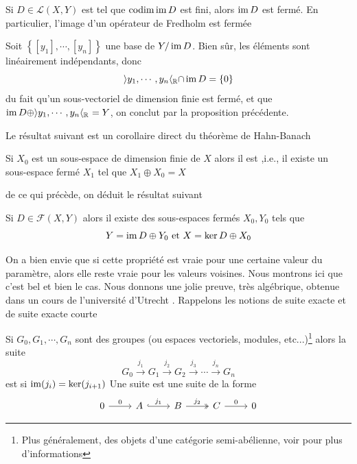 \documentclass[memoire.tex]{subfiles}
\begin{document}
\begin{corollaire}\label{im-fred-closed}
    Si $D\in\mathcal{L}(X,Y)$ est tel que $\operatorname*{codim} \operatorname{im} D$ est fini, alors $\operatorname{im} D$ est fermé. En particulier, l'image d'un opérateur de Fredholm est fermée
\end{corollaire}
\begin{preuve}
    Soit  $\left\{[y_1],\cdots, [y_n]\right\}$ une base de  $Y/\operatorname{im} D$. Bien sûr, les éléments sont linéairement indépendants, donc 
    \begin{equation*}
        \rangle y_1,\cdots,y_n\langle_{\mathbb{R}}\cap \operatorname{im} D = \{0\}
    \end{equation*}
    du fait qu'un sous-vectoriel de dimension finie est fermé, et que $\operatorname{im} D \oplus\rangle y_1,\cdots,y_n\langle_{\mathbb{R}}\ =Y $, on conclut par la proposition précédente.
\end{preuve}
Le résultat suivant est un corollaire direct du théorème de Hahn-Banach
\begin{lemme}
Si $X_0$ est un sous-espace de dimension finie de $X$ alors il est ,i.e., il existe un sous-espace fermé $X_1$ tel que $X_1\oplus X_0=X$
\end{lemme}
de ce qui précède, on déduit le résultat suivant
\begin{proposition}\label{spliting}
    Si $D\in\mathcal{F}(X,Y)$ alors il existe des sous-espaces fermés $X_0,Y_0$ tels que 
    \begin{equation*}
        Y=\operatorname{im} D \oplus Y_0\text{ et } X=\ker D\oplus X_0
    \end{equation*}
\end{proposition}
On a bien envie que si cette propriété 
est vraie pour une certaine valeur du 
paramètre, alors elle reste vraie pour 
les valeurs voisines. Nous montrons ici 
que c'est bel et bien le cas. Nous donnons une jolie preuve, très algébrique, obtenue dans un cours de l'université d'Utrecht \cite{Marcut2009FredholmNotes}. 
Rappelons les notions de suite exacte et de suite exacte courte
\begin{definition}
    Si $G_0,G_1,\cdots, G_n$ sont des groupes (ou espaces vectoriels, modules, etc...)\footnote{Plus généralement, des objets d'une catégorie semi-abélienne, voir  pour plus d'informations} alors la suite 
    \begin{equation*}
       G_0 \xrightarrow{j_1} G_1 \xrightarrow{j_2} G_2 \xrightarrow{j_3} \cdots \xrightarrow{j_n} G_n
    \end{equation*}
    est  si $\operatorname{im}(j_i)=\ker(j_{i+1})$
    Une suite  est une suite de la forme
    \[\begin{tikzcd}
	0 & A & B & C & 0
	\arrow["0", from=1-1, to=1-2]
	\arrow["{j_1}", hook, from=1-2, to=1-3]
	\arrow["{j_2}", two heads, from=1-3, to=1-4]
	\arrow["0", from=1-4, to=1-5]
    \end{tikzcd}\]
\end{definition}
\end{document}
